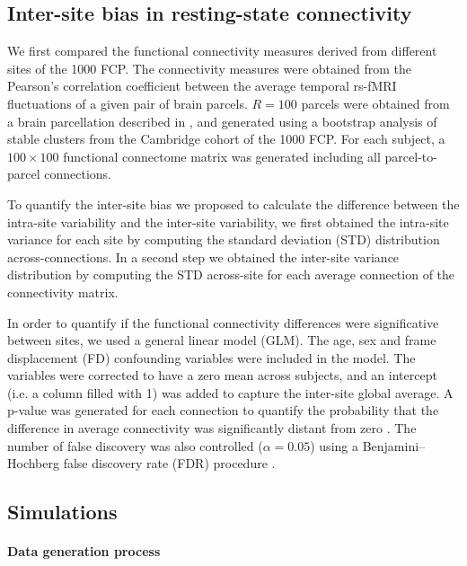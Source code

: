 \documentclass[authoryear]{elsarticle}
\begin{document}
\subsection{Inter-site bias in resting-state connectivity}
We first compared the functional connectivity measures derived from different sites of the 1000 FCP. The connectivity measures were obtained from the Pearson’s correlation coefficient between the average temporal rs-fMRI fluctuations of a given pair of brain parcels. $R=100$ parcels were obtained from a brain parcellation described in \cite{Orban2015}, and generated using a bootstrap analysis of stable clusters \citep{Bellec2010c} from the Cambridge cohort of the 1000 FCP. For each subject, a $100 \times 100$ functional connectome matrix was generated including all parcel-to-parcel connections. 

To quantify the inter-site bias we proposed to calculate the difference between the intra-site variability and the inter-site variability, we first obtained the intra-site variance for each site by computing the standard deviation (STD) distribution across-connections. In a second step we obtained the inter-site variance distribution by computing the STD across-site for each average connection of the connectivity matrix.

In order to quantify if the functional connectivity differences were significative between sites, we used a  general linear model (GLM). The age, sex and frame displacement (FD) confounding variables were included in the model.  The variables were corrected to have a zero mean across subjects, and an intercept (i.e. a column filled with 1) was added to capture the inter-site global average. A p-value was generated for each connection to quantify the probability that the difference in average connectivity was significantly distant from zero \citep{Worsley1995}. The number of false discovery was also controlled ($\alpha=0.05$) using a Benjamini–Hochberg false discovery rate (FDR) procedure \citep{Benjamini1995}.


\subsection{Simulations}
\paragraph{Data generation process}
\end{document}
